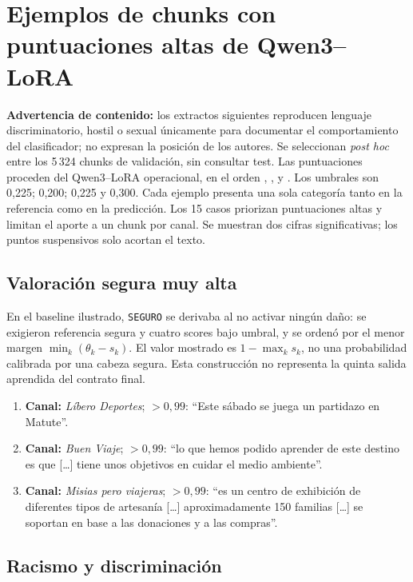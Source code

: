 \section{Ejemplos de chunks con puntuaciones altas de Qwen3--LoRA}
\label{app:ejemplos_scores}

\textbf{Advertencia de contenido:} los extractos siguientes reproducen lenguaje discriminatorio, hostil o sexual únicamente para documentar el comportamiento del clasificador; no expresan la posición de los autores. Se seleccionan \emph{post hoc} entre los 5\,324 chunks de validación, sin consultar test. Las puntuaciones proceden del Qwen3--LoRA operacional, en el orden \Rac, \Gen, \Ame{} y \Sex. Los umbrales son 0,225; 0,200; 0,225 y 0,300. Cada ejemplo presenta una sola categoría tanto en la referencia como en la predicción. Los 15 casos priorizan puntuaciones altas y limitan el aporte a un chunk por canal. Se muestran dos cifras significativas; los puntos suspensivos solo acortan el texto.

\subsection*{Valoración segura muy alta}

En el baseline ilustrado, \texttt{SEGURO} se derivaba al no activar ningún daño: se exigieron referencia segura y cuatro scores bajo umbral, y se ordenó por el menor margen \(\min_k(\theta_k-s_k)\). El valor mostrado es \(1-\max_k s_k\), no una probabilidad calibrada por una cabeza segura. Esta construcción no representa la quinta salida aprendida del contrato final.

\begin{enumerate}
\item \textbf{Canal:} \emph{Líbero Deportes}; \(>0,99\): ``Este sábado se juega un partidazo en Matute''.
\item \textbf{Canal:} \emph{Buen Viaje}; \(>0,99\): ``lo que hemos podido aprender de este destino es que [\ldots] tiene unos objetivos en cuidar el medio ambiente''.
\item \textbf{Canal:} \emph{Misias pero viajeras}; \(>0,99\): ``es un centro de exhibición de diferentes tipos de artesanía [\ldots] aproximadamente 150 familias [\ldots] se soportan en base a las donaciones y a las compras''.
\end{enumerate}

\subsection*{Racismo y discriminación}

